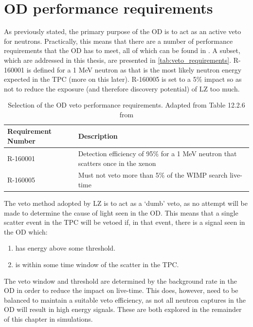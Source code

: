 \section{OD performance requirements}
\label{sec:simulated_od_requirements}
\par
As previously stated, the primary purpose of the OD is to act as an active veto for neutrons.
Practically, this means that there are a number of performance requirements that the OD has to meet, all of which can be found in \cite{LZ_TechnicalDesignReview_ref}.
A subset, which are addressed in this thesis, are presented in \autoref{tab:veto_requirements}.
R-160001 is defined for a 1 MeV neutron as that is the most likely neutron energy expected in the TPC (more on this later).
R-160005 is set to a 5\% impact so as not to reduce the exposure (and therefore discovery potential) of LZ too much.
\begin{table}[]
    \centering
    \begin{tabular}{p{}p{}} %
    \hline
    {Requirement Number} & {Description} \\ \hline
    R-160001             & Detection efficiency of 95\% for a 1 MeV neutron that scatters once in the xenon \\
    R-160005             & Must not veto more than 5\% of the WIMP search live-time
    \end{tabular}
    \caption{Selection of the OD veto performance requirements. Adapted from Table 12.2.6 from \cite{LZ_TechnicalDesignReview_ref}}
    \label{tab:veto_requirements}
\end{table} 

\par
The veto method adopted by LZ is to act as a `dumb' veto, as no attempt will be made to determine the cause of light seen in the OD.
This means that a single scatter event in the TPC will be vetoed if, in that event, there is a signal seen in the OD which:
\begin{enumerate}
    \item has energy above some threshold.
    \item is within some time window of the scatter in the TPC. 
\end{enumerate}
The veto window and threshold are determined by the background rate in the OD in order to reduce the impact on live-time.
This does, however, need to be balanced to maintain a suitable veto efficiency, as not all neutron captures in the OD will result in high energy signals.
These are both explored in the remainder of this chapter in simulations.

